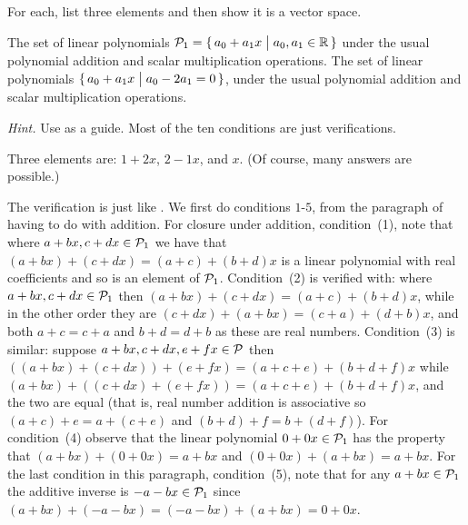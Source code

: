 \begin{exercises}
\begin{answer}
\begin{exparts*}
      \end{exparts*}  
    \end{answer}
  \recommended \item 
    For each, list three elements and then show it is a vector space.
    \begin{exparts}
      \partsitem The set of linear polynomials
        \( \mathcal{P}_1=\mbox{$\{\,a_0+a_1x\bigm| a_0,a_1\in\mathbb{R}\,\}$} \) under the
        usual polynomial addition and scalar multiplication operations.
      \partsitem The set of linear polynomials
        \( \mbox{$\{\,a_0+a_1x\bigm| a_0-2a_1=0\,\}$} \), under the
        usual polynomial addition and scalar multiplication operations.
   \end{exparts}
   \textit{Hint.}  Use  as a guide.
   Most of the ten conditions are just verifications. 
   \begin{answer}
      \begin{exparts}
        \partsitem 
          Three elements are: 
          $1+2x$, $2-1x$, and $x$.
          (Of course, many answers are possible.)

          The verification is just like . 
          We first do 
          conditions $1$-$5$, from 
          the paragraph of  having to 
          do with addition.
          For closure under addition, condition~(1), 
          note that where $a+bx,c+dx\in\mathcal{P}_1$
          we have that $(a+bx)+(c+dx)=(a+c)+(b+d)x$ is a linear polynomial
          with real coefficients and so is an element of 
          $\mathcal{P}_1$. 
          Condition~(2) is verified with: where $a+bx,c+dx\in\mathcal{P}_1$ then 
          $(a+bx)+(c+dx)=(a+c)+(b+d)x$, while in the other order they are
          $(c+dx)+(a+bx)=(c+a)+(d+b)x$, and both $a+c=c+a$ 
          and $b+d=d+b$ as these are real numbers.
          Condition~(3) is similar: suppose
          $a+bx,c+dx,e+fx\in\mathcal{P}$ then
          $((a+bx)+(c+dx))+(e+fx)=(a+c+e)+(b+d+f)x$
          while
          $(a+bx)+((c+dx)+(e+fx))=(a+c+e)+(b+d+f)x$, and the two are equal
          (that is, real number addition is associative so $(a+c)+e=a+(c+e)$
          and $(b+d)+f=b+(d+f)$).
          For condition~(4) observe that the linear polynomial
          $0+0x\in\mathcal{P}_1$ has the 
          property that $(a+bx)+(0+0x)=a+bx$ and 
          $(0+0x)+(a+bx)=a+bx$.
          For the last condition in this paragraph, condition~(5),
          note that for any $a+bx\in\mathcal{P}_1$ the additive inverse
          is $-a-bx\in\mathcal{P}_1$ since
          $(a+bx)+(-a-bx)=(-a-bx)+(a+bx)=0+0x$.
         

\end{exparts}
\end{answer}
\end{exercises}
